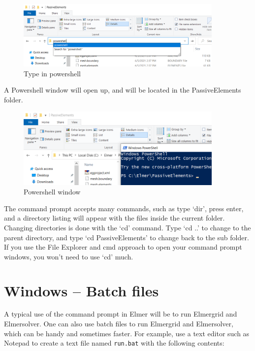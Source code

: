 \begin{figure}[H]
\centering
\includegraphics[width=0.9\textwidth]{cmd-5}
\caption{Type in powershell}\label{fg:cmd-5}
\end{figure}

A Powershell window will open up, and will be located in the PassiveElements folder.\\

\begin{figure}[H]
\centering
\includegraphics[width=0.9\textwidth]{cmd-6}
\caption{Powershell window}\label{fg:cmd-6}
\end{figure}


The command prompt accepts many commands, such as type `dir', press enter, and a directory listing will appear with the files inside the current folder.  Changing directories is done with the `cd' command.   Type `cd ..' to change to the parent directory, and type `cd PassiveElements' to change back to the sub folder.  If you use the File Explorer and cmd approach to open your command prompt windows, you won't need to use `cd' much.

\section{Windows -- Batch files}

A typical use of the command prompt in Elmer will be to run Elmergrid and Elmersolver.  One can also use batch files to run Elmergrid and Elmersolver, which can be handy and sometimes faster.  For example, use a text editor such as Notepad to create a text file named \texttt{run.bat} with the following contents:

